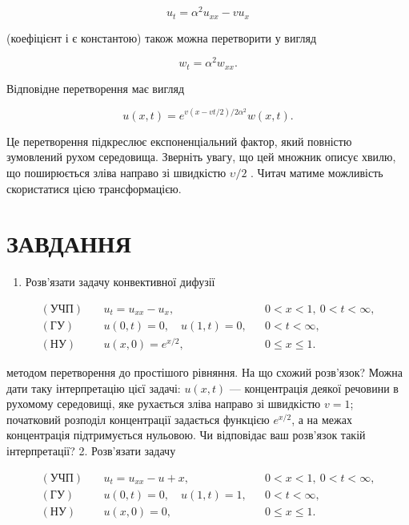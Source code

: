 \documentclass[
  ukrainian,
]{article}
\providecommand{\tightlist}{%
  \setlength{\itemsep}{0pt}\setlength{\parskip}{0pt}}
\begin{document}
\[
u_t = \alpha^2 u_{xx} - v u_x
\]

(коефіцієнт і є константою) також можна перетворити у вигляд

\[
w_t = \alpha^2 w_{xx}.
\]

Відповідне перетворення має вигляд

\[
u(x, t) = e^{v(x-vt/2)/2\alpha^2}w(x, t).
\]

Це перетворення підкреслює експоненціальний фактор, який повністю
зумовлений рухом середовища. Зверніть увагу, що цей множник описує
хвилю, що поширюється зліва направо зі швидкістю \(\upsilon/2\) . Читач
матиме можливість скористатися цією трансформацією.

\section{ЗАВДАННЯ}\label{ux437ux430ux432ux434ux430ux43dux43dux44f-1}

\begin{enumerate}
\def\labelenumi{\arabic{enumi}.}
\tightlist
\item
  Розв'язати задачу конвективної дифузії
\end{enumerate}

\[
\begin{aligned}
(\text{УЧП})\quad & u_t = u_{xx} - u_x, && 0 < x < 1,\ 0 < t < \infty, \\
(\text{ГУ})\quad & u(0,t) = 0,\quad u(1,t) = 0, && 0 < t < \infty, \\
(\text{НУ})\quad & u(x,0) = e^{x/2}, && 0 \leqslant x \leqslant 1.
\end{aligned}
\]

методом перетворення до простішого рівняння. На що схожий розв'язок?
Можна дати таку інтерпретацію цієї задачі: \(u(x,t)\) --- концентрація
деякої речовини в рухомому середовищі, яке рухається зліва направо зі
швидкістю \(v = 1\); початковий розподіл концентрації задається функцією
\(e^{x/2}\), а на межах концентрація підтримується нульовою. Чи
відповідає ваш розв'язок такій інтерпретації? 2. Розв'язати задачу

\[
\begin{aligned}
(\text{УЧП})\quad & u_t = u_{xx} - u + x, && 0 < x < 1,\ 0 < t < \infty, \\
(\text{ГУ})\quad & u(0,t) = 0,\quad u(1,t) = 1, && 0 < t < \infty, \\
(\text{НУ})\quad & u(x,0) = 0, && 0 \leqslant x \leqslant 1.
\end{aligned}
\]
\end{document}
